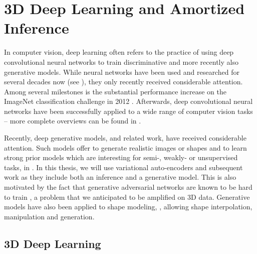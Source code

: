 \section{3D Deep Learning and Amortized Inference}

In computer vision, deep learning often refers to the practice of using
deep convolutional neural networks \cite{LeCunBoserDenkerHenderson:1989}
to train discriminative and more recently also generative models. 
While neural networks have been used and researched for several decades now (\eg see
\cite{Bishop:1995,Haykin:2005,Rosenblatt:1958,RumelhartHintonWilliams:1986,
HornikStinchcombeWhite:1989}), they only recently received considerable attention.
Among several milestones is the substantial performance increase on the ImageNet
classification challenge \cite{DengFeiFei:2009} in 2012 \cite{KrizhevskySutskeverHinton:2012}.
Afterwards, deep convolutional neural networks have been successfully applied
to a wide range of computer vision tasks -- more complete overviews can be found in
\cite{Schmidhuber:2014,WangRajXing:2017,Li:2017,
BengioCourvilleVincent:2012,LeCunBengioGeoffrey:2015,
GoodfellowBengioCourville:2016}.

Recently, deep generative models, \eg
\cite{VanDenOordKavukcuoglu:2016,VanDenOordGraves:2016,GoodfellowBengio:2014,
MakhzaniGoodfellow:2015,KingmaWelling:2013,LarsenWinther:2016}
and related work, have received considerable attention. Such models offer
to generate realistic images or shapes and to learn strong prior models
which are interesting for semi-, weakly- or unsupervised tasks, \eg in
\cite{KingmaMohamedRezendeWelling:2014}. In this thesis, we will use variational
auto-encoders and subsequent work \cite{ImAhnMemisevicBengio:2017,JangGuPoole:2016,MaddisonMnihTeh:2016} as they
include both an inference and a generative model. This is also motivated by
the fact that generative adversarial networks \cite{GoodfellowBengio:2014}
are known to be hard to train
\cite{MeschederGeiger:2017,NowozinTomioka:2016,SalimansGoodfellowChen:2016,
GulrajaniCourville:2017,ArjovskyBottou:2017},
a problem that we anticipated to be amplified on 3D data. Generative models
have also been applied to shape modeling, \eg
\cite{SmithMeger:2017,GirdharGupta:2016,%
BrockWeston:2016,WuSongXiao:2015,WuTenenbaum:2016}, allowing
shape interpolation, manipulation and generation.

\subsection{3D Deep Learning}


